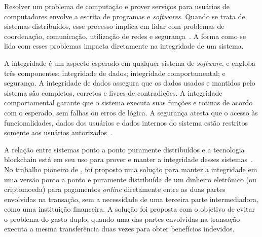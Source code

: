Resolver um problema de computação e prover serviços para usuários de computadores envolve a escrita de programas e \textit{softwares}. Quando se trata de sistemas distribuídos, esse processo implica em lidar com problemas de coordenação, comunicação, utilização de redes e segurança~\cite{overview-blockchainbasic2018drescher}. A forma como se lida com esses problemas impacta diretamente na integridade de um sistema.


A integridade é um aspecto esperado em qualquer sistema de \textit{software}, e engloba três componentes: integridade de dados; integridade comportamental; e segurança. A integridade de dados assegura que os dados usados e mantidos pelo sistema são completos, corretos e livres de contradições. A integridade comportamental garante que o sistema executa suas funções e rotinas de acordo com o esperado, sem falhas ou erros de lógica. A segurança atesta que o acesso às funcionalidades, dados dos usuários e dados internos do sistema estão restritos somente aos usuários autorizados~\cite{tanembaum2007sistemas}. 

A relação entre sistemas ponto a ponto puramente distribuídos e a tecnologia blockchain está em seu uso para prover e manter a integridade desses sistemas~\cite{overview-blockchainbasic2018drescher}. No trabalho pioneiro de , foi proposto uma solução para manter a integridade em uma versão ponto a ponto e puramente distribuída de um dinheiro eletrônico (ou criptomoeda) para pagamentos \textit{online} diretamente entre as duas partes envolvidas na transação, sem a necessidade de uma terceira parte intermediadora, como uma instituição financeira. A solução foi proposta com o objetivo de evitar o problema do gasto duplo, quando uma das partes envolvidas na transação executa a mesma transferência duas vezes para obter benefícios indevidos.

